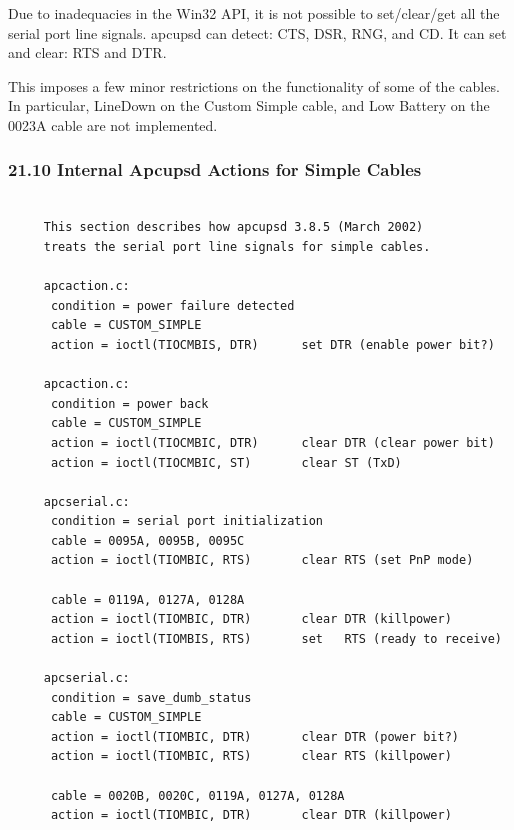 {{{{{{{{{{\label{index-Cables-213}
\label{index-Windows-214}
Due to inadequacies in the Win32 API, it is not possible to set/clear/get all
the serial port line signals. apcupsd can detect: CTS, DSR, RNG, and CD. It
can set and clear: RTS and DTR.  

This imposes a few minor restrictions on the functionality of some of the
cables. In particular, LineDown on the Custom Simple cable, and Low Battery on
the 0023A cable are not implemented. 

\label{Internal-Apcupsd-Actions-for-Simple-Cables}

\subsubsection*{21.10 Internal Apcupsd Actions for Simple Cables}

\label{index-Cables-215}

\footnotesize
\begin{verbatim}
     
     This section describes how apcupsd 3.8.5 (March 2002)
     treats the serial port line signals for simple cables.
     
     apcaction.c:
      condition = power failure detected
      cable = CUSTOM_SIMPLE
      action = ioctl(TIOCMBIS, DTR)      set DTR (enable power bit?)
     
     apcaction.c:
      condition = power back
      cable = CUSTOM_SIMPLE
      action = ioctl(TIOCMBIC, DTR)      clear DTR (clear power bit)
      action = ioctl(TIOCMBIC, ST)       clear ST (TxD)
     
     apcserial.c:
      condition = serial port initialization
      cable = 0095A, 0095B, 0095C
      action = ioctl(TIOMBIC, RTS)       clear RTS (set PnP mode)
     
      cable = 0119A, 0127A, 0128A
      action = ioctl(TIOMBIC, DTR)       clear DTR (killpower)
      action = ioctl(TIOMBIS, RTS)       set   RTS (ready to receive)
     
     apcserial.c:
      condition = save_dumb_status
      cable = CUSTOM_SIMPLE
      action = ioctl(TIOMBIC, DTR)       clear DTR (power bit?)
      action = ioctl(TIOMBIC, RTS)       clear RTS (killpower)
     
      cable = 0020B, 0020C, 0119A, 0127A, 0128A
      action = ioctl(TIOMBIC, DTR)       clear DTR (killpower)
     

\end{verbatim}}}}}}}}}}}
